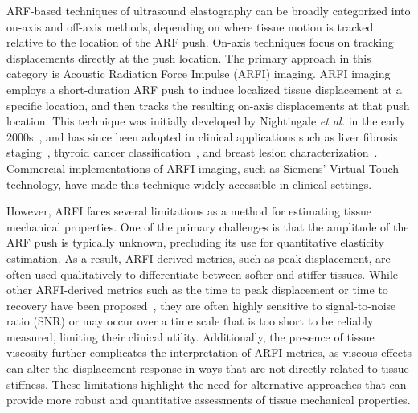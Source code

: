 
ARF-based techniques of ultrasound elastography can be broadly categorized into on-axis and off-axis methods, depending on where tissue motion is tracked relative to the location of the ARF push. On-axis techniques focus on tracking displacements directly at the push location. The primary approach in this category is Acoustic Radiation Force Impulse (ARFI) imaging. ARFI imaging employs a short-duration ARF push to induce localized tissue displacement at a specific location, and then tracks the resulting on-axis displacements at that push location. This technique was initially developed by Nightingale \emph{et al.} in the early 2000s~\cite{nightingale_feasibility_2001,nightingale_Acoustic_2002}, and has since been adopted in clinical applications such as liver fibrosis staging~\cite{nierhoff_efficiency_2013,shiina_WFUMB_2015}, thyroid cancer classification~\cite{zhan_Acoustic_2015,zhang_Acoustic_2015}, and breast lesion characterization~\cite{balleyguier_Breast_2013}. Commercial implementations of ARFI imaging, such as Siemens' Virtual Touch technology, have made this technique widely accessible in clinical settings.


However, ARFI faces several limitations as a method for estimating tissue mechanical properties. One of the primary challenges is that the amplitude of the ARF push is typically unknown, precluding its use for quantitative elasticity estimation. As a result, ARFI-derived metrics, such as peak displacement, are often used qualitatively to differentiate between softer and stiffer tissues. While other ARFI-derived metrics such as the time to peak displacement or time to recovery have been proposed~\cite{sarvazyan_Shear_1998,nightingale_Acoustic_2011}, they are often highly sensitive to signal-to-noise ratio (SNR) or may occur over a time scale that is too short to be reliably measured, limiting their clinical utility. Additionally, the presence of tissue viscosity further complicates the interpretation of ARFI metrics, as viscous effects can alter the displacement response in ways that are not directly related to tissue stiffness. These limitations highlight the need for alternative approaches that can provide more robust and quantitative assessments of tissue mechanical properties.

